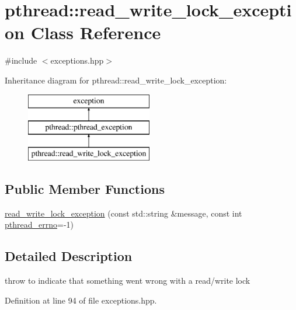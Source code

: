 \hypertarget{classpthread_1_1read__write__lock__exception}{\section{pthread\+:\+:read\+\_\+write\+\_\+lock\+\_\+exception Class Reference}
\label{classpthread_1_1read__write__lock__exception}
}


{\ttfamily \#include $<$exceptions.\+hpp$>$}

Inheritance diagram for pthread\+:\+:read\+\_\+write\+\_\+lock\+\_\+exception\+:\begin{figure}[H]
\begin{center}
\leavevmode
\includegraphics[height=3.000000cm]{classpthread_1_1read__write__lock__exception}
\end{center}
\end{figure}
\subsection*{Public Member Functions}
\begin{DoxyCompactItemize}
\item 
\hyperlink{classpthread_1_1read__write__lock__exception_a62da10d4753dffbec177b68cdbf6df65}{read\+\_\+write\+\_\+lock\+\_\+exception} (const std\+::string \&message, const int \hyperlink{classpthread_1_1pthread__exception_a4a869173054faca1945ac1a7729082d6}{pthread\+\_\+errno}=-\/1)
\end{DoxyCompactItemize}


\subsection{Detailed Description}
throw to indicate that something went wrong with a read/write lock 

Definition at line 94 of file exceptions.\+hpp.



